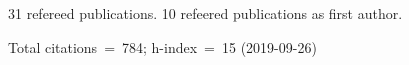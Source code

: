 31 refereed publications. 10 refeered publications as first author.

Total citations~=~784; h-index~=~15 (2019-09-26)